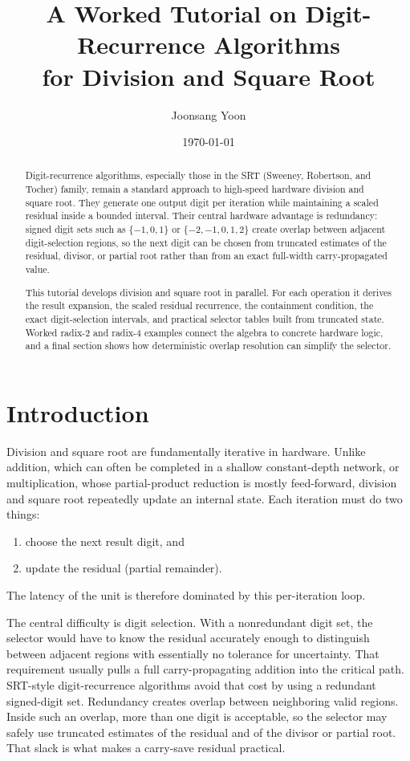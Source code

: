 \documentclass[11pt]{article}
\title{A Worked Tutorial on Digit-Recurrence Algorithms\\for Division and Square Root}
\author{Joonsang Yoon}
\date{\today}
\numberwithin{equation}{section}
\begin{document}
\maketitle

\begin{abstract}
Digit-recurrence algorithms, especially those in the SRT (Sweeney, Robertson, and Tocher) family,
remain a standard approach to high-speed hardware division and square root.
They generate one output digit per iteration while maintaining a scaled residual inside a bounded
interval.
Their central hardware advantage is redundancy: signed digit sets such as $\{-1,0,1\}$ or
$\{-2,-1,0,1,2\}$ create overlap between adjacent digit-selection regions, so the next digit can be
chosen from truncated estimates of the residual, divisor, or partial root rather than from an exact
full-width carry-propagated value.

This tutorial develops division and square root in parallel.
For each operation it derives the result expansion, the scaled residual recurrence, the containment
condition, the exact digit-selection intervals, and practical selector tables built from truncated
state.
Worked radix-2 and radix-4 examples connect the algebra to concrete hardware logic, and a final
section shows how deterministic overlap resolution can simplify the selector.
\end{abstract}

\clearpage

\tableofcontents

\clearpage

\section{Introduction}
\label{sec:introduction}

Division and square root are fundamentally iterative in hardware.
Unlike addition, which can often be completed in a shallow constant-depth network, or
multiplication, whose partial-product reduction is mostly feed-forward, division and square root
repeatedly update an internal state.
Each iteration must do two things:
\begin{enumerate}
  \item choose the next result digit, and
  \item update the residual (partial remainder).
\end{enumerate}
The latency of the unit is therefore dominated by this per-iteration loop.

The central difficulty is digit selection.
With a nonredundant digit set, the selector would have to know the residual accurately enough to
distinguish between adjacent regions with essentially no tolerance for uncertainty.
That requirement usually pulls a full carry-propagating addition into the critical path.
SRT-style digit-recurrence algorithms avoid that cost by using a redundant signed-digit set.
Redundancy creates overlap between neighboring valid regions.
Inside such an overlap, more than one digit is acceptable, so the selector may safely use truncated
estimates of the residual and of the divisor or partial root.
That slack is what makes a carry-save residual practical.
\end{document}
